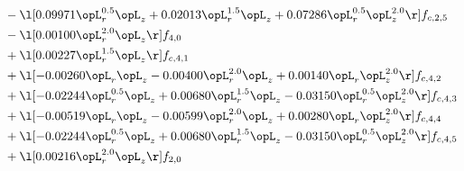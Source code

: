 \begin{alignat}{2}
& - \l[  0.09971 \opL_r^{0.5} \opL_z +  0.02013 \opL_r^{1.5} \opL_z +  0.07286 \opL_r^{0.5} \opL_z^{2.0}  \r] f_{c,2,5} \nonumber \\ 
& - \l[  0.00100 \opL_r^{2.0} \opL_z  \r] f_{4,0} \nonumber \\ 
& + \l[  0.00227 \opL_r^{1.5} \opL_z  \r] f_{c,4,1} \nonumber \\ 
& + \l[  -0.00260 \opL_r \opL_z   -0.00400 \opL_r^{2.0} \opL_z +  0.00140 \opL_r \opL_z^{2.0}  \r] f_{c,4,2} \nonumber \\ 
& + \l[  -0.02244 \opL_r^{0.5} \opL_z +  0.00680 \opL_r^{1.5} \opL_z   -0.03150 \opL_r^{0.5} \opL_z^{2.0}  \r] f_{c,4,3} \nonumber \\ 
& + \l[  -0.00519 \opL_r \opL_z   -0.00599 \opL_r^{2.0} \opL_z +  0.00280 \opL_r \opL_z^{2.0}  \r] f_{c,4,4} \nonumber \\ 
& + \l[  -0.02244 \opL_r^{0.5} \opL_z +  0.00680 \opL_r^{1.5} \opL_z   -0.03150 \opL_r^{0.5} \opL_z^{2.0}  \r] f_{c,4,5} \nonumber \\ 
& + \l[  0.00216 \opL_r^{2.0} \opL_z  \r] f_{2,0} \nonumber \\ 
\end{alignat} 


